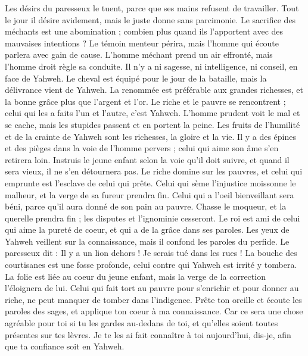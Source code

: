 \begin{multicols}{2}
Les désirs du paresseux le tuent, parce que ses mains refusent de travailler.
Tout le jour il désire avidement, mais le juste donne sans parcimonie.
Le sacrifice des méchants est une abomination ; combien plus quand ils l'apportent avec des mauvaises intentions ?
Le témoin menteur périra, mais l'homme qui écoute parlera avec gain de cause.
L'homme méchant prend un air effronté, mais l'homme droit règle sa conduite.
Il n'y a ni sagesse, ni intelligence, ni conseil, en face de Yahweh.
Le cheval est équipé pour le jour de la bataille, mais la délivrance vient de Yahweh.
\VerseOne{}La renommée est préférable aux grandes richesses, et la bonne grâce plus que l'argent et l'or.
Le riche et le pauvre se rencontrent ; celui qui les a faits l’un et l’autre, c'est Yahweh.
L'homme prudent voit le mal et se cache, mais les stupides passent et en portent la peine.
Les fruits de l’humilité et de la crainte de Yahweh sont les richesses, la gloire et la vie.
Il y a des épines et des pièges dans la voie de l’homme pervers ; celui qui aime son âme s'en retirera loin.
Instruis le jeune enfant selon la voie qu’il doit suivre, et quand il sera vieux, il ne s'en détournera pas.
Le riche domine sur les pauvres, et celui qui emprunte est l’esclave de celui qui prête.
Celui qui sème l’injustice moissonne le malheur, et la verge de sa fureur prendra fin.
Celui qui a l'oeil bienveillant sera béni, parce qu'il aura donné de son pain au pauvre.
Chasse le moqueur, et la querelle prendra fin ; les disputes et l'ignominie cesseront.
Le roi est ami de celui qui aime la pureté de coeur, et qui a de la grâce dans ses paroles.
Les yeux de Yahweh veillent sur la connaissance, mais il confond les paroles du perfide.
Le paresseux dit : Il y a un lion dehors ! Je serais tué dans les rues !
La bouche des courtisanes est une fosse profonde, celui contre qui Yahweh est irrité y tombera.
La folie est liée au coeur du jeune enfant, mais la verge de la correction l’éloignera de lui.
Celui qui fait tort au pauvre pour s’enrichir et pour donner au riche, ne peut manquer de tomber dans l'indigence.
Prête ton oreille et écoute les paroles des sages, et applique ton coeur à ma connaissance.
Car ce sera une chose agréable pour toi si tu les gardes au-dedans de toi, et qu’elles soient toutes présentes sur tes lèvres.
Je te les ai fait connaître à toi aujourd’hui, dis-je, afin que ta confiance soit en Yahweh.

\end{multicols}
